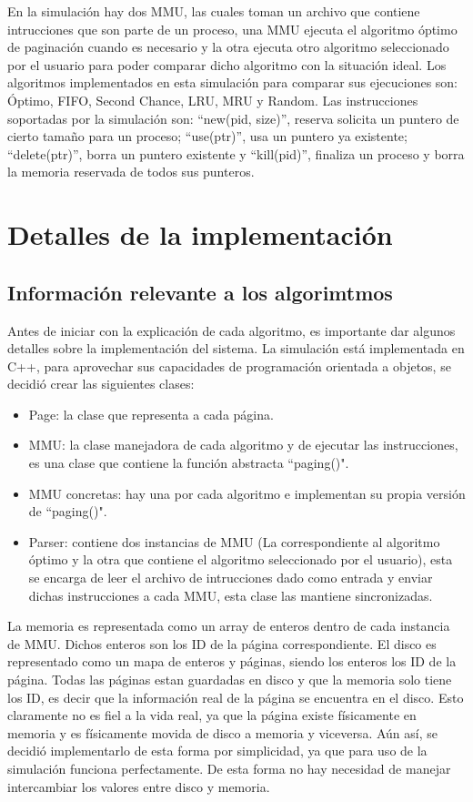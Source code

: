\documentclass{report}
\begin{document}
En la  simulación hay dos MMU, las cuales toman un archivo que contiene intrucciones que son parte de un proceso, una MMU ejecuta el algoritmo óptimo de paginación cuando es necesario y la otra ejecuta otro algoritmo seleccionado por el usuario para poder comparar dicho algoritmo con la situación ideal.
Los algoritmos implementados en esta simulación para comparar sus ejecuciones son: Óptimo, FIFO, Second Chance, LRU, MRU y Random.
Las instrucciones soportadas por la simulación son: ``new(pid, size)'', reserva solicita un puntero de cierto tamaño para un proceso; ``use(ptr)'', usa un puntero ya existente; ``delete(ptr)'', borra un puntero existente y ``kill(pid)'', finaliza un proceso y borra la memoria reservada de todos sus punteros. \\ 

\chapter{Detalles de la implementación}
\section {Información relevante a los algorimtmos}
Antes de iniciar con la explicación de cada algoritmo, es importante dar algunos detalles sobre la implementación del sistema. 
La simulación está implementada en C++, para aprovechar sus capacidades de programación orientada a objetos, se decidió crear las siguientes clases:

\begin{itemize}
    \item Page: la clase que representa a cada página.
    \item MMU: la clase manejadora de cada algoritmo y de ejecutar las instrucciones, es una clase que contiene la función  abstracta ``paging()".
    \item MMU concretas: hay una por cada algoritmo e implementan su propia versión de ``paging()".
    \item Parser: contiene dos instancias de MMU (La correspondiente al algoritmo óptimo y la otra que contiene el algoritmo seleccionado por el usuario), esta se encarga de leer el archivo de intrucciones dado como entrada y enviar dichas instrucciones a cada MMU, esta clase las mantiene sincronizadas. 
\end{itemize}

La memoria es representada como un array de enteros dentro de cada instancia de MMU. 
Dichos enteros son los ID de la página correspondiente. 
El disco es representado como un mapa de enteros y páginas, siendo los enteros los ID de la página.
Todas las páginas estan guardadas en disco y que la memoria solo tiene los ID, es decir que la información real de la página se encuentra en el disco.
Esto claramente no es fiel a la vida real, ya que la página existe físicamente en memoria y es físicamente movida de disco a memoria y viceversa.
Aún así, se decidió implementarlo de esta forma por simplicidad, ya que para uso de la simulación funciona perfectamente.
De esta forma no hay necesidad de manejar intercambiar los valores entre disco y memoria.
\end{document}
